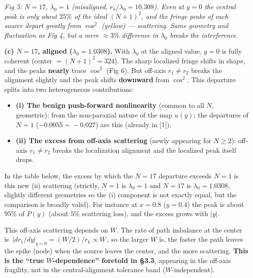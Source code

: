 \documentclass[
]{article}
\providecommand{\tightlist}{%
  \setlength{\itemsep}{0pt}\setlength{\parskip}{0pt}}
\begin{document}
\emph{Fig 5: \(N=17\), \(\lambda_0=1\) (misaligned,
\(r_k/\lambda_0=10.308\)). Even at \(y=0\) the central peak is only
about \(25\%\) of the ideal \((N+1)^2\), and the fringe peaks of each
source depart greatly from \(\cos^2\) (yellow) --- scattering. Same
geometry and fluctuation as Fig 4, but a mere \(\approx3\%\) difference
in \(\lambda_0\) breaks the interference.}

\textbf{(c) \(N=17\), aligned (\(\lambda_0=1.0308\)).} With
\(\lambda_0\) at the aligned value, \(y=0\) is fully coherent (center
\(=(N+1)^2=324\)). The sharp localized fringe shifts in shape, and the
peaks \textbf{nearly} trace \(\cos^2\) (Fig 6). But off-axis
\(r_1\neq r_2\) breaks the alignment slightly and the peak shifts
\textbf{downward} from \(\cos^2\). This departure splits into two
heterogeneous contributions:

\begin{itemize}
\tightlist
\item
  \textbf{(i) The benign push-forward nonlinearity} (common to all
  \(N\), geometric): from the non-paraxial nature of the map \(u(y)\);
  the departures of \(N=1\) (\(-0.0055\!\sim\!-0.027\)) are this
  (already in {[}1{]}).
\item
  \textbf{(ii) The excess from off-axis scattering} (newly appearing for
  \(N\ge2\)): off-axis \(r_1\neq r_2\) breaks the localization alignment
  and the localized peak itself drops.
\end{itemize}

In the table below, the excess by which the \(N=17\) departure exceeds
\(N=1\) is this new (ii) scattering (strictly, \(N=1\) is
\(\lambda_0=1\) and \(N=17\) is \(\lambda_0=1.0308\), slightly different
geometries so the (i) component is not exactly equal, but the comparison
is broadly valid). For instance at \(x=0.8\) (\(y=0.4\)) the peak is
about \(95\%\) of \(P(y)\) (about \(5\%\) scattering loss), and the
excess grows with \(|y|\).

This off-axis scattering depends on \(W\). The rate of path imbalance at
the center is \(\,\big|dr_1/dy\big|_{y=0}=(W/2)/r_k\propto W\,\), so the
larger \(W\) is, the faster the path leaves the spike (node) when the
source leaves the center, and the more scattering. \textbf{This is the
``true \(W\)-dependence'' foretold in §3.3}, appearing in the off-axis
fragility, not in the central-alignment tolerance band
(\(W\)-independent).
\end{document}
